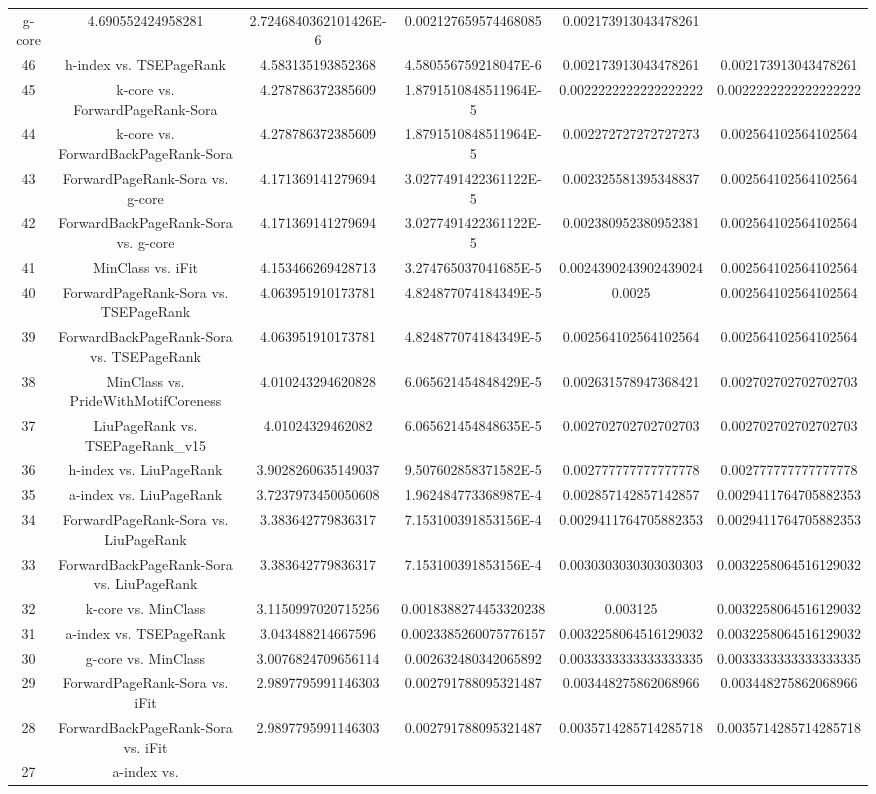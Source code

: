 \documentclass[a4paper,10pt]{article}
\begin{document}
\begin{landscape}
\begin{table}[!htp]
\begin{tabular}{cccccc}
g-core&4.690552424958281&2.7246840362101426E-6&0.002127659574468085&0.002173913043478261\\46&h-index vs. TSEPageRank&4.583135193852368&4.580556759218047E-6&0.002173913043478261&0.002173913043478261\\45&k-core vs. ForwardPageRank-Sora&4.278786372385609&1.8791510848511964E-5&0.0022222222222222222&0.0022222222222222222\\44&k-core vs. ForwardBackPageRank-Sora&4.278786372385609&1.8791510848511964E-5&0.002272727272727273&0.002564102564102564\\43&ForwardPageRank-Sora vs. g-core&4.171369141279694&3.0277491422361122E-5&0.002325581395348837&0.002564102564102564\\42&ForwardBackPageRank-Sora vs. g-core&4.171369141279694&3.0277491422361122E-5&0.002380952380952381&0.002564102564102564\\41&MinClass vs. iFit&4.153466269428713&3.274765037041685E-5&0.0024390243902439024&0.002564102564102564\\40&ForwardPageRank-Sora vs. TSEPageRank&4.063951910173781&4.824877074184349E-5&0.0025&0.002564102564102564\\39&ForwardBackPageRank-Sora vs. TSEPageRank&4.063951910173781&4.824877074184349E-5&0.002564102564102564&0.002564102564102564\\38&MinClass vs. PrideWithMotifCoreness&4.010243294620828&6.065621454848429E-5&0.002631578947368421&0.002702702702702703\\37&LiuPageRank vs. TSEPageRank_v15&4.01024329462082&6.065621454848635E-5&0.002702702702702703&0.002702702702702703\\36&h-index vs. LiuPageRank&3.9028260635149037&9.507602858371582E-5&0.002777777777777778&0.002777777777777778\\35&a-index vs. LiuPageRank&3.7237973450050608&1.962484773368987E-4&0.002857142857142857&0.0029411764705882353\\34&ForwardPageRank-Sora vs. LiuPageRank&3.383642779836317&7.153100391853156E-4&0.0029411764705882353&0.0029411764705882353\\33&ForwardBackPageRank-Sora vs. LiuPageRank&3.383642779836317&7.153100391853156E-4&0.0030303030303030303&0.0032258064516129032\\32&k-core vs. MinClass&3.1150997020715256&0.0018388274453320238&0.003125&0.0032258064516129032\\31&a-index vs. TSEPageRank&3.043488214667596&0.0023385260075776157&0.0032258064516129032&0.0032258064516129032\\30&g-core vs. MinClass&3.0076824709656114&0.002632480342065892&0.0033333333333333335&0.0033333333333333335\\29&ForwardPageRank-Sora vs. iFit&2.9897795991146303&0.002791788095321487&0.003448275862068966&0.003448275862068966\\28&ForwardBackPageRank-Sora vs. iFit&2.9897795991146303&0.002791788095321487&0.0035714285714285718&0.0035714285714285718\\27&a-index vs. 
\end{tabular}
\end{table}
\end{landscape}
\end{document}
